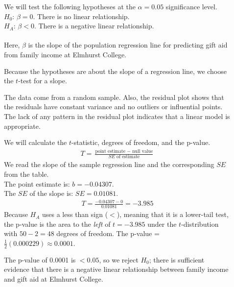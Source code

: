 \begin{examplewrap}
\begin{nexample}
\begin{description}
\item[]  We will test the following hypotheses at the $\alpha=0.05$ significance level.\\
$H_0$: $\beta = 0$. There is no linear relationship.\\
$H_A$: $\beta < 0$. There is a negative linear relationship.  
\\
\\
Here, $\beta$ is the slope of the population regression line for predicting gift aid from family income at Elmhurst College.
\item[] Because the hypotheses are about the slope of a regression line, we choose the $t$-test for a slope.  
\item[]  The data come from a random sample.  Also, the residual plot shows that the residuals have constant variance and no outliers or influential points.  The lack of any pattern in the residual plot indicates that a linear model is appropriate.
\item[]  We will calculate the $t$-statistic, degrees of freedom, and the p-value.
\begin{align*}
T = \frac{\text{point estimate } - \text{ null value}}{SE \text{ of estimate}}
\end{align*}
We read the slope of the sample regression line and the corresponding $SE$ from the table.
\\
The point estimate is: $b = -0.04307$.
\\
The $SE$ of the slope is: $SE = 0.01081$.  
\begin{align*}
T = \frac{-0.04307 - 0}{0.01081} = -3.985
\end{align*}
Because $H_A$ uses a less than sign ($<$), meaning that it is a lower-tail test, the \mbox{p-value} is the area to the \emph{left} of $t=-3.985$ under the $t$-distribution with $50-2=48$ degrees of freedom.  The p-value = $\frac{1}{2}(0.000229)\approx 0.0001$.  
\item[]  The p-value of 0.0001 is $< 0.05$, so we reject $H_0$; there is sufficient evidence that there is a negative linear relationship between family income and gift aid at Elmhurst College.  
\end{description}



\end{nexample}
\end{examplewrap}
\label{overallAidIncomeInformalAssessmentOfRegressionLineSlope}




